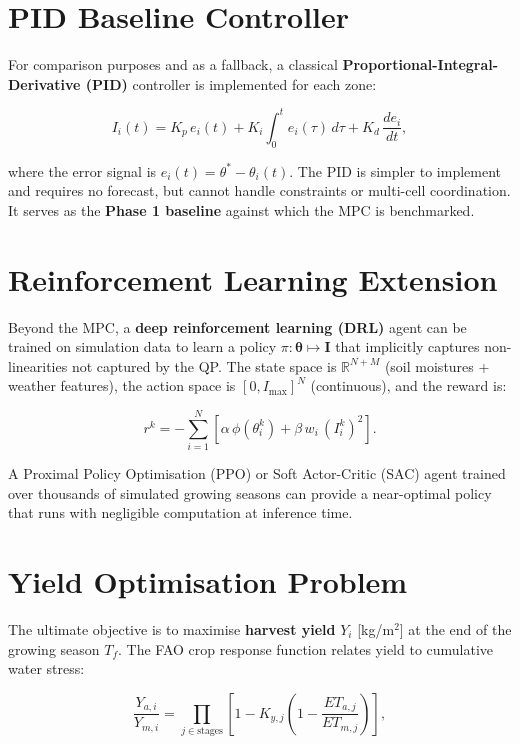 \documentclass[12pt, a4paper]{report}
\begin{document}
\section{PID Baseline Controller}

For comparison purposes and as a fallback, a classical \textbf{Proportional-Integral-Derivative (PID)} controller is implemented for each zone:

\begin{equation}
  I_i(t) = K_p\,e_i(t) + K_i\int_0^t e_i(\tau)\,d\tau + K_d\,\frac{de_i}{dt},
  \label{eq:PID}
\end{equation}

where the error signal is $e_i(t) = \theta^* - \theta_i(t)$. The PID is simpler to implement and requires no forecast, but cannot handle constraints or multi-cell coordination. It serves as the \textbf{Phase 1 baseline} against which the MPC is benchmarked.

\section{Reinforcement Learning Extension}

Beyond the MPC, a \textbf{deep reinforcement learning (DRL)} agent can be trained on simulation data to learn a policy $\pi: \bm{\theta} \mapsto \mathbf{I}$ that implicitly captures non-linearities not captured by the QP. The state space is $\mathbb{R}^{N+M}$ (soil moistures + weather features), the action space is $[0, I_{\max}]^N$ (continuous), and the reward is:

\begin{equation}
  r^k = -\sum_{i=1}^N \left[\alpha\,\phi(\theta_i^k) + \beta\,w_i\,(I_i^k)^2\right].
\end{equation}

A Proximal Policy Optimisation (PPO) or Soft Actor-Critic (SAC) agent trained over thousands of simulated growing seasons can provide a near-optimal policy that runs with negligible computation at inference time.

\section{Yield Optimisation Problem}

The ultimate objective is to maximise \textbf{harvest yield} $Y_i$ [kg/m$^2$] at the end of the growing season $T_f$. The FAO crop response function relates yield to cumulative water stress:

\begin{equation}
  \frac{Y_{a,i}}{Y_{m,i}} = \prod_{j \in \text{stages}} \left[1 - K_{y,j}\left(1 - \frac{ET_{a,j}}{ET_{m,j}}\right)\right],
  \label{eq:yield}
\end{equation}
\end{document}
